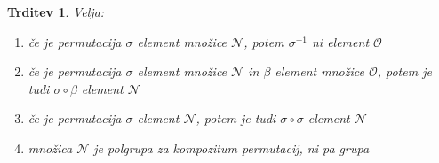 \documentclass[12pt,a4paper,reqno]{amsart}
\theoremstyle{definition} %
\theoremstyle{plain} %
\newtheorem{trditev}[definicija]{Trditev}
\begin{document}
\begin{trditev}\label{trd:o in n}
Velja:
\begin{enumerate}
\item če je permutacija $\sigma$ element množice $\mathcal{N}$, potem $\sigma^{-1}$ ni element $\mathcal{O}$ \label{itm1:1}
\item če je permutacija $\sigma$ element množice $\mathcal{N}$  in $\beta$ element množice $\mathcal{O}$, potem je tudi $\sigma \circ \beta$ element $\mathcal{N}$ \label{itm1:2}
\item če je permutacija $\sigma$ element $\mathcal{N}$, potem je tudi $\sigma \circ \sigma$ element $\mathcal{N}$ \label{itm1:3}
\item množica $\mathcal{N}$ je polgrupa za kompozitum permutacij, ni pa grupa \label{itm1:4}
\end{enumerate}
\end{trditev}
\end{document}
